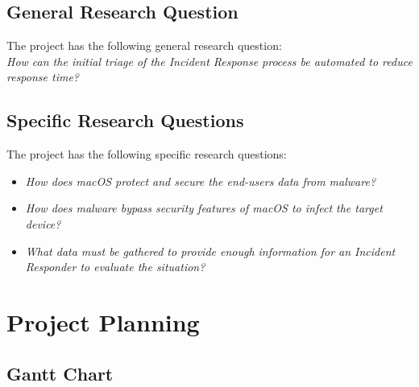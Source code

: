 \documentclass[11pt,a4paper]{article}
\begin{document}
\subsection{General Research Question}

The project has the following general research question:\\

\textit{How can the initial triage of the Incident Response process be automated to reduce response time?}

\subsection{Specific Research Questions}

The project has the following specific research questions:\\

\begin{itemize}
	\item{\textit{How does macOS protect and secure the end-users data from malware?}}
	\item{\textit{How does malware bypass security features of macOS to infect the target device?}}
	\item{\textit{What data must be gathered to provide enough information for an Incident Responder to evaluate the situation?}}
\end{itemize}


\newpage

\section{Project Planning}

\subsection{Gantt Chart}


\end{document}
